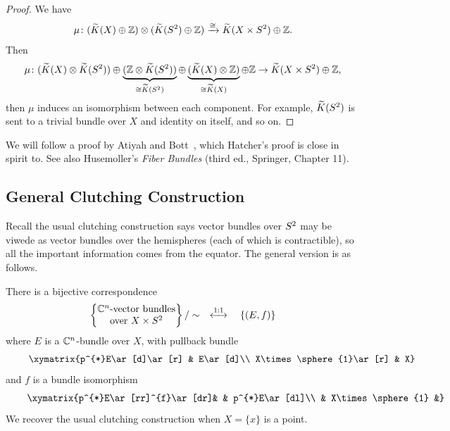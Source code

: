 \begin{proof}
We have
\begin{equation}
\mu\colon(\widetilde{K}(X)\oplus\mathbb{Z})\otimes(\widetilde{K}(S^{2})\oplus\mathbb{Z})\xrightarrow{\cong}\widetilde{K}(X\times S^{2})\oplus\mathbb{Z}.
\end{equation}
Then
\begin{equation}
\mu\colon(\widetilde{K}(X)\otimes\widetilde{K}(S^{2}))\oplus\underbrace{(\mathbb{Z}\otimes\widetilde{K}(S^{2}))}_{\cong\widetilde{K}(S^{2})}\oplus\underbrace{(\widetilde{K}(X)\otimes\mathbb{Z})}_{\cong\widetilde{K}(X)}\oplus\mathbb{Z}\to\widetilde{K}(X\times S^{2})\oplus\mathbb{Z},
\end{equation}
then $\mu$ induces an isomorphism between each component. For example,
$\widetilde{K}(S^{2})$ is sent to a trivial bundle over $X$ and
identity on itself, and so on.
\end{proof}

\begin{node}
We will follow a proof by Atiyah and Bott~\cite{atiyah1964periodicity},
which Hatcher's proof is close in spirit to. See also Husemoller's
\textit{Fiber Bundles} (third ed., Springer, Chapter 11).
\end{node}

\subsection{General Clutching Construction}

\begin{node}
Recall the usual clutching construction says vector bundles over
$S^{2}$ may be viwede as vector bundles over the hemispheres
(each of which is contractible), so all the important information
comes from the equator. The general version is as follows.
\end{node}

\begin{claim}
There is a bijective correspondence
\begin{equation}
\left\{\begin{matrix}\mathbb{C}^{n}\mbox{-vector bundles}\\
\mbox{over }X\times S^{2}
\end{matrix}\right\}/\sim\quad\stackrel{1:1}{\longleftrightarrow}\quad\{(E,f)\}
\end{equation}
where $E$ is a $\mathbb{C}^{n}$-bundle over $X$, with pullback bundle
\begin{equation}
\vcenter{\xymatrix{p^{*}E\ar[d]\ar[r] & E\ar[d]\\
X\times\sphere{1}\ar[r] & X}}
\end{equation}
and $f$ is a bundle isomorphism
\begin{equation}
\vcenter{\xymatrix{p^{*}E\ar[rr]^{f}\ar[dr]& & p^{*}E\ar[dl]\\
& X\times\sphere{1} &}}.
\end{equation}
We recover the usual clutching construction when $X=\{x\}$ is a point.
\end{claim}

